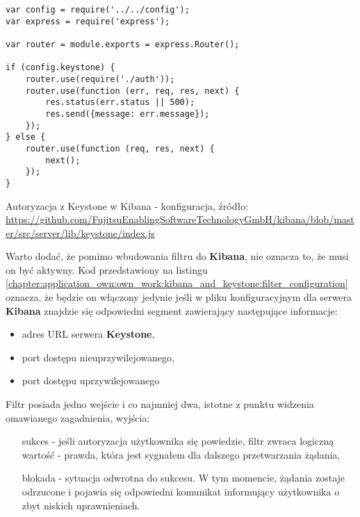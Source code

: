     \begin{listing}
        \begin{verbatim}
var config = require('../../config');
var express = require('express');

var router = module.exports = express.Router();

if (config.keystone) {
    router.use(require('./auth'));
    router.use(function (err, req, res, next) {
        res.status(err.status || 500);
        res.send({message: err.message});
    });
} else {
    router.use(function (req, res, next) {
        next();
    });
}
        \end{verbatim}
        \caption[Autoryzacja z Keystone w Kibana - konfiguracja]{Autoryzacja z Keystone w Kibana - konfiguracja, źródło: \url{https://github.com/FujitsuEnablingSoftwareTechnologyGmbH/kibana/blob/master/src/server/lib/keystone/index.js}}
        \label{chapter:application_own:own_work:kibana_and_keystone:filter_configuration}
    \end{listing}
    
    Warto dodać, że pomimo wbudowania filtru do \textbf{Kibana}, nie oznacza to, że musi on być aktywny. Kod
    przedstawiony na listingu \ref{chapter:application_own:own_work:kibana_and_keystone:filter_configuration} oznacza,
    że będzie on włączony jedynie jeśli w pliku konfiguracyjnym dla serwera \textbf{Kibana} znajdzie się odpowiedni
    segment zawierający następujące informacje:
    \begin{itemize}
        \item adres URL serwera \textbf{Keystone},
        \item port dostępu nieuprzywilejowanego,
        \item port dostępu uprzywilejowanego
    \end{itemize}
    
    Filtr posiada jedno wejście i co najmniej dwa, istotne z punktu widzenia omawianego zagadnienia, wyjścia:
    \begin{itemize}
        \item[sukces] - jeśli autoryzacja użytkownika się powiedzie, filtr zwraca logiczną wartość - prawda,
        która jest sygnałem dla dalszego przetwarzania żądania,
        \item[blokada] - sytuacja odwrotna do sukcesu. W tym momencie, żądania zostaje odrzucone
        i pojawia się odpowiedni komunikat informujący użytkownika o zbyt niskich uprawnieniach.
    \end{itemize}
    
